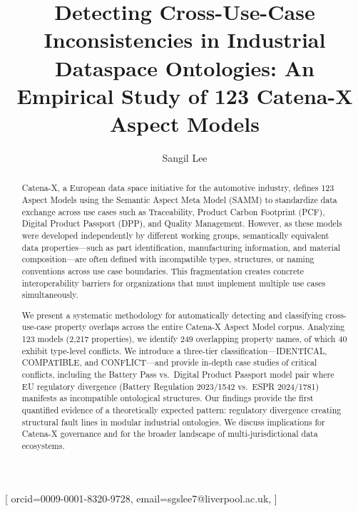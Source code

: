 \documentclass[]{ceurart}
\begin{document}


\title{Detecting Cross-Use-Case Inconsistencies in Industrial Dataspace Ontologies:
  An Empirical Study of 123 Catena-X Aspect Models}

\author[1]{Sangil Lee}[%
  orcid=0009-0001-8320-9728,
  email=sgslee7@liverpool.ac.uk,
]
\cormark[1]

\address[1]{Department of Computer Science, University of Liverpool, Liverpool, UK}


\begin{abstract}
  Catena-X, a European data space initiative for the automotive industry, defines 123
  Aspect Models using the Semantic Aspect Meta Model (SAMM) to standardize data
  exchange across use cases such as Traceability, Product Carbon Footprint (PCF),
  Digital Product Passport (DPP), and Quality Management. However, as these
  models were developed independently by different working groups, semantically
  equivalent data properties---such as part identification, manufacturing
  information, and material composition---are often defined with incompatible
  types, structures, or naming conventions across use case boundaries. This
  fragmentation creates concrete interoperability barriers for organizations
  that must implement multiple use cases simultaneously.

  We present a systematic methodology for automatically detecting
  and classifying cross-use-case property overlaps across the entire Catena-X
  Aspect Model corpus. Analyzing 123 models (2{,}217 properties), we identify
  249 overlapping property names, of which 40 exhibit type-level conflicts. We
  introduce a three-tier classification---IDENTICAL, COMPATIBLE, and
  CONFLICT---and provide in-depth case studies of critical conflicts, including
  the Battery Pass vs.\ Digital Product Passport model pair where EU regulatory
  divergence (Battery Regulation 2023/1542 vs.\ ESPR 2024/1781) manifests as
  incompatible ontological structures. Our findings provide the first
  quantified evidence of a theoretically expected pattern: regulatory
  divergence creating structural fault lines in modular industrial
  ontologies. We discuss implications for Catena-X governance and for the
  broader landscape of multi-jurisdictional data ecosystems.
\end{abstract}
\end{document}
